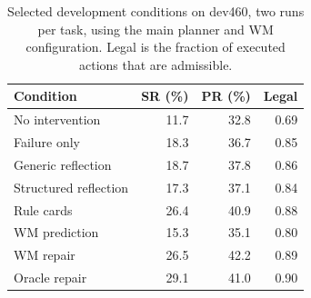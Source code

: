 \begin{table}[tbp]
\caption{Selected development conditions on dev460, two runs per task, using the main planner and WM configuration. Legal is the fraction of executed actions that are admissible.}
\label{tab:development}\centering
\begin{tabular}{lrrr}\toprule
Condition & SR (\%) & PR (\%) & Legal\\\midrule
No intervention & 11.7 & 32.8 & 0.69\\
Failure only & 18.3 & 36.7 & 0.85\\
Generic reflection & 18.7 & 37.8 & 0.86\\
Structured reflection & 17.3 & 37.1 & 0.84\\
Rule cards & 26.4 & 40.9 & 0.88\\
WM prediction & 15.3 & 35.1 & 0.80\\
WM repair & 26.5 & 42.2 & 0.89\\
Oracle repair & 29.1 & 41.0 & 0.90\\\bottomrule
\end{tabular}
\end{table}
